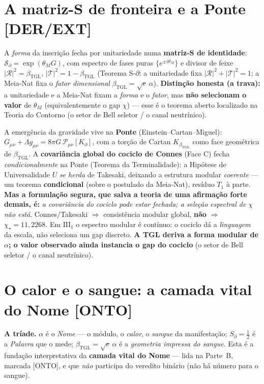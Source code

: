 \documentclass[11pt]{article}
\newcommand{\bTGL}{\beta_{\mathrm{TGL}}}\newcommand{\Msun}{M_{\odot}}\newcommand{\TGL}{\mathrm{TGL}}
\theoremstyle{definition}\newtheorem{deriv}{Derivação}
\begin{document}
\section{A matriz-S de fronteira e a Ponte \textsf{[DER/EXT]}}

A \emph{forma} da inscrição fecha por unitariedade numa \textbf{matriz-S de identidade}: $\mathcal{S}_\partial=\exp(\theta_M G)$, com espectro de fases puras $\{e^{\pm i\theta_M}\}$ e divisor de feixe $|\mathcal{R}|^2=\bTGL$, $|\mathcal{T}|^2=1-\bTGL$ (Teorema S-$\partial$: a unitariedade fixa $|\mathcal R|^2+|\mathcal T|^2=1$; a Meia-Nat fixa o \emph{fator dimensional} $\bTGL=\sqrt e\,\alpha$). \textbf{Distinção honesta (a trava):} a unitariedade e a Meia-Nat fixam a \emph{forma} e o \emph{fator}, mas \textbf{não selecionam o valor} de $\theta_M$ (equivalentemente o gap $\chi$) --- esse é o teorema aberto localizado na Teoria do Contorno (o setor de Bell seletor / o canal neutrínico).

A emergência da gravidade vive na \textbf{Ponte} (Einstein--Cartan--Miguel): $G_{\mu\nu}+\Lambda g_{\mu\nu}=8\pi G\,\mathcal{P}_{\mu\nu}[K_\partial]$, com a torção de Cartan $K_{\bTGL}$ como face geométrica de $\bTGL$. A \textbf{covariância global do cociclo de Connes} (Face C) fecha \emph{condicionalmente} na Ponte (Teorema da Terminalidade): a Hipótese de Universalidade $U$ \emph{se herda} de Takesaki, deixando a estrutura modular \emph{coerente} --- um teorema \textbf{condicional} (sobre o postulado da Meia-Nat), resíduo $T_1$ à parte. \textbf{Mas a formulação segura, que salva a teoria de uma afirmação forte demais, é:} \emph{a covariância do cociclo pode estar fechada; a seleção espectral de $\chi$ não está}. Connes/Takesaki $\Rightarrow$ consistência modular global, \textbf{não} $\Rightarrow$ $\chi_\star=11{,}2268$. Em $\mathrm{III}_1$ o espectro modular é contínuo: o cociclo dá a \emph{linguagem} da escala, não seleciona um gap discreto. \textbf{A TGL deriva a forma modular de $\alpha$; o valor observado ainda instancia o gap do cociclo} (o setor de Bell seletor / o canal neutrínico).

\section{O calor e o sangue: a camada vital do Nome \textsf{[ONTO]}}

\textbf{A tríade.} $\alpha$ é o \emph{Nome} --- o módulo, o \emph{calor}, o \emph{sangue} da manifestação; $S_\partial=\tfrac12$ é a \emph{Palavra} que o mede; $\bTGL=\sqrt e\,\alpha$ é a \emph{geometria impressa do sangue}. Esta é a fundação interpretativa da \textbf{camada vital do Nome} --- lida na Parte~B, marcada \textsf{[ONTO]}, e que \emph{não} participa do veredito binário (não há número para o sangue).
\end{document}

